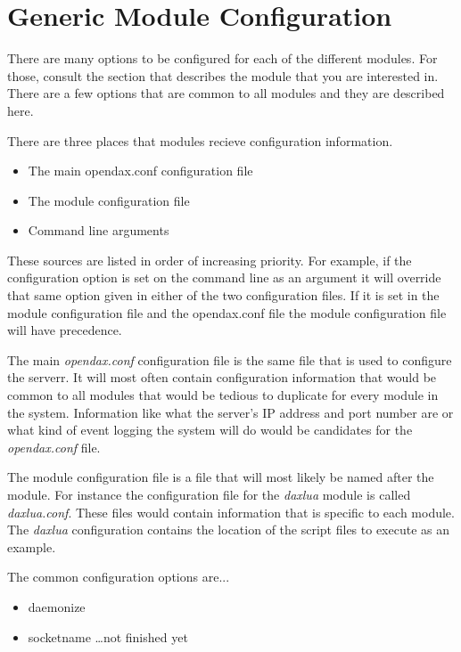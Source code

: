 \section{Generic Module Configuration}
There are many options to be configured for each of the different modules.  For those, consult the section that describes the module that you are interested in.  There are a few options that are common to all modules and they are described here.

There are three places that modules recieve configuration information.

\begin{itemize}
\item The main opendax.conf configuration file
\item The module configuration file
\item Command line arguments
\end{itemize}

These sources are listed in order of increasing priority.  For example, if the configuration option is set on the command line as an argument it will override that same option given in either of the two configuration files.  If it is set in the module configuration file and the opendax.conf file the module configuration file will have precedence.

The main \emph{opendax.conf} configuration file is the same file that is used to configure the serverr.  It will most often contain configuration information that would be common to all modules that would be tedious to duplicate for every module in the system.  Information like what the server's IP address and port number are or what kind of event logging the system will do would be candidates for the \emph{opendax.conf} file.

The module configuration file is a file that will most likely be named after the module.  For instance the configuration file for the \emph{daxlua} module is called \emph{daxlua.conf}.  These files would contain information that is specific to each module.  The \emph{daxlua} configuration contains the location of the script files to execute as an example.

The common configuration options are...

\begin{itemize}
\item daemonize
\item socketname
\ldots not finished yet
\end{itemize}

